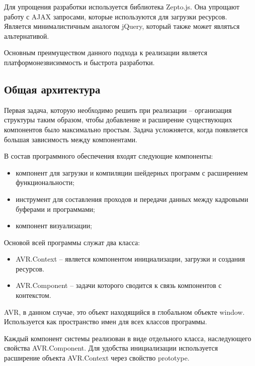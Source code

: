 Для упрощения разработки используется библиотека Zepto.js. Она упрощают работу с AJAX запросами, 
которые используются для загрузки ресурсов. Является минималистичным аналогом jQuery, 
который также может являться альтернативой.

Основным преимуществом данного подхода к реализации является платформонезвисиммость и быстрота 
разработки.

\subsection{Общая архитектура}

Первая задача, которую необходимо решить при реализации -- организация структуры таким образом, 
чтобы добавление и расширение существующих компонентов было максимально простым. Задача
усложняется, когда появляется большая зависимость между компонентами.

В состав программного обеспечения входят следующие компоненты:

\begin{itemize}
  \item компонент для загрузки и компиляции шейдерных программ с расширением
    функциональности;
  \item инструмент для составления проходов и передачи данных между кадровыми буферами и 
    программами;
  \item компонент визуализации;
\end{itemize}

Основой всей программы служат два класса: 

\begin{itemize}
  \item AVR.Context -- является компонентом инициализации, загрузки и создания ресурсов.
  \item AVR.Component -- задачи которого сводится к связь компонентов с контекстом.
\end{itemize}

AVR, в данном случае, это объект находящийся в глобальном объекте window. Используется 
как пространство имен для всех классов программы. 

Каждый компонент системы реализован в виде отдельного класса, наследующего свойства 
AVR.Component. Для удобства инициализации используется расширение объекта AVR.Context
через свойство prototype.

